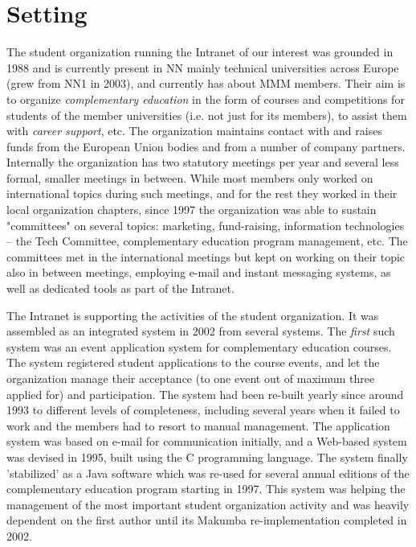 \documentclass{acm_proc_article-sp}
\begin{document}

\section{Setting}\label{sec:setting}
The student organization running the Intranet of our interest was grounded in 1988 and is currently present in NN mainly technical universities across Europe (grew from NN1 in 2003), and currently has about MMM members. Their aim is to organize {\it complementary education} in the form of courses and competitions for students of the member universities (i.e. not just for its members), to assist them with {\it career support}, etc. 
The organization maintains contact with and raises funds from the European Union bodies and from a number of company partners. Internally the organization has two statutory meetings per year and several less formal, smaller meetings in between. While most members only worked on international topics during such meetings, and for the rest they worked in their local organization chapters, since 1997 the organization was able to sustain "committees" on several topics: marketing, fund-raising, information technologies -- the Tech Committee, complementary education program management, etc. The committees met in the international meetings but kept on working on their topic also in between meetings, employing e-mail and instant messaging systems, as well as dedicated tools as part of the Intranet.

The Intranet is supporting the activities of the student organization. It was assembled as an integrated system in 2002 from several systems. The {\it first} such system was an event application system for complementary education courses. The system registered student applications to the course events, and let the organization manage their acceptance (to one event out of maximum three applied for) and participation. The system had been re-built yearly since around 1993 to different levels of completeness, including several years when it failed to work and the members had to resort to manual management. The application system was based on e-mail for communication initially, and a Web-based system was devised in 1995, built using the C programming language. The system finally 'stabilized' as a Java software which was re-used for several annual editions of the complementary education program starting in 1997. This system was helping the management of the most important student organization activity and was heavily dependent on the first author until its Makumba re-implementation completed in 2002.
\end{document}
